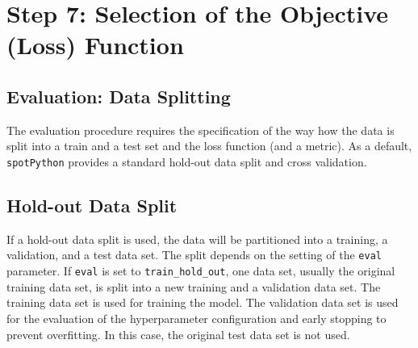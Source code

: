 \documentclass[
  letterpaper,
  DIV=11,
  numbers=noendperiod]{scrreprt}
\begin{document}
\hypertarget{step-7-selection-of-the-objective-loss-function-1}{%
\section{Step 7: Selection of the Objective (Loss)
Function}\label{step-7-selection-of-the-objective-loss-function-1}}

\hypertarget{sec-data-splitting-14}{%
\subsection{Evaluation: Data Splitting}\label{sec-data-splitting-14}}

The evaluation procedure requires the specification of the way how the
data is split into a train and a test set and the loss function (and a
metric). As a default, \texttt{spotPython} provides a standard hold-out
data split and cross validation.

\hypertarget{hold-out-data-split}{%
\subsection{Hold-out Data Split}\label{hold-out-data-split}}

If a hold-out data split is used, the data will be partitioned into a
training, a validation, and a test data set. The split depends on the
setting of the \texttt{eval} parameter. If \texttt{eval} is set to
\texttt{train\_hold\_out}, one data set, usually the original training
data set, is split into a new training and a validation data set. The
training data set is used for training the model. The validation data
set is used for the evaluation of the hyperparameter configuration and
early stopping to prevent overfitting. In this case, the original test
data set is not used.
\end{document}
